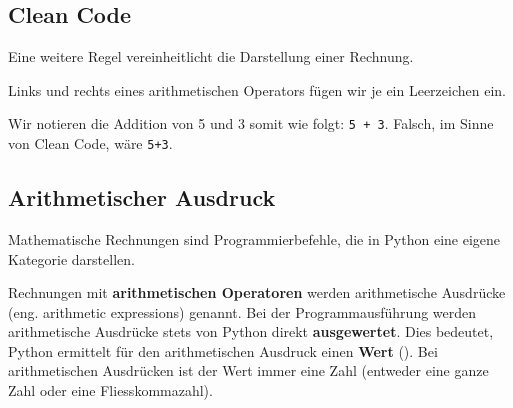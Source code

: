 \subsection{Clean Code}

Eine weitere Regel vereinheitlicht die Darstellung einer Rechnung.

\begin{cleancode}[Leerzeichen 3]
Links und rechts eines arithmetischen Operators fügen wir je ein Leerzeichen ein.
\end{cleancode}

\begin{example}
Wir notieren die Addition von \num{5} und \num{3} somit wie folgt: \lstinline{5 + 3}. Falsch, im Sinne von Clean Code, wäre \lstinline{5+3}.
\end{example}

\newpage

\subsection{Arithmetischer Ausdruck}

Mathematische Rechnungen sind Programmierbefehle, die in Python eine eigene Kategorie darstellen.

\begin{definition}
	Rechnungen mit \textbf{arithmetischen Operatoren} werden arithmetische Ausdrücke (eng. arithmetic expressions) genannt. Bei der Programmausführung werden arithmetische Ausdrücke stets von Python direkt \textbf{ausgewertet}. Dies bedeutet, Python ermittelt für den arithmetischen Ausdruck einen \textbf{Wert} (). Bei arithmetischen Ausdrücken ist der Wert immer eine Zahl (entweder eine ganze Zahl oder eine Fliesskommazahl). 
\end{definition}

